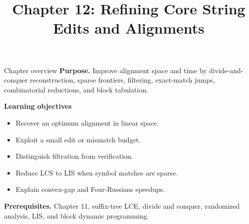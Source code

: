 \documentclass[11pt,letterpaper]{article}
\title{Chapter 12: Refining Core String Edits and Alignments}
\author{}
\date{}
\begin{document}
\maketitle

\begin{CornellOverviewBox}{Chapter overview}
\textbf{Purpose.} Improve alignment space and time by divide-and-conquer reconstruction, sparse frontiers, filtering, exact-match jumps, combinatorial reductions, and block tabulation.

\textbf{Learning objectives}
\begin{itemize}
  \item Recover an optimum alignment in linear space.
  \item Exploit a small edit or mismatch budget.
  \item Distinguish filtration from verification.
  \item Reduce LCS to LIS when symbol matches are sparse.
  \item Explain convex-gap and Four-Russians speedups.
\end{itemize}

\textbf{Prerequisites.} Chapter 11, suffix-tree LCE, divide and conquer, randomized analysis, LIS, and block dynamic programming.
\end{CornellOverviewBox}
\end{document}
